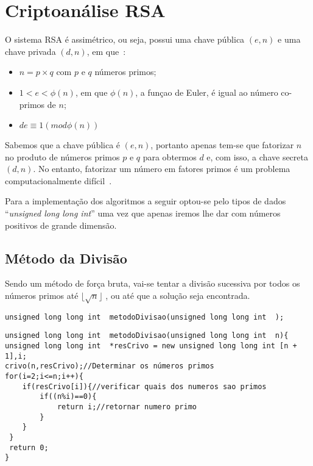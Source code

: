 
\chapter{Criptoanálise RSA}
\label{sec:CriptoanaliseRSA}

O sistema RSA é assimétrico, ou seja, possui uma chave pública $(e,n)$ e uma chave privada $(d,n)$, em que~\cite{Quaresma2009a}:

\begin{itemize}
    \item[]$n=p \times q$ com $p$ e $q$ números primos;
    \item[]$1<e< \phi(n)$, em que $\phi(n)$, a funçao de Euler, é igual ao número co-primos de $n$;
    \item[]$de\equiv 1(mod\phi(n))$
\end{itemize}

Sabemos que a chave pública é $(e,n)$, portanto apenas tem-se que fatorizar $n$ no produto de números primos $p$ e $q$ para obtermos $d$ e, com isso, a chave secreta $(d,n)$. No entanto, fatorizar um número em fatores primos é um problema computacionalmente difícil~\cite{Quaresma2009a}.

Para a implementação dos algoritmos a seguir optou-se pelo tipos de dados ``\emph{unsigned long long int}'' uma vez que apenas iremos lhe dar com números positivos de grande dimensão.


\section{Método da Divisão}
\label{sec:MetodoDivisao}

Sendo um método de força bruta, vai-se tentar a divisão sucessiva por todos os números primos até $\lfloor \sqrt{n} \rfloor$ , ou até que a solução seja encontrada.

\begin{lstlisting}[frame=single,mathescape=true,caption={Criptoanálise RSA ---Especificação de \texttt{MétodoDivisao}},captionpos=b,label={lst:metodoEuclides},basicstyle=\footnotesize]
unsigned long long int  metodoDivisao(unsigned long long int  );
\end{lstlisting}

\begin{lstlisting}[frame=single,mathescape=true,caption={Método de Divisão},captionpos=b,label={lst:MetodoDivisao},basicstyle=\footnotesize]
unsigned long long int  metodoDivisao(unsigned long long int  n){	
unsigned long long int  *resCrivo = new unsigned long long int [n + 1],i;
crivo(n,resCrivo);//Determinar os números primos
for(i=2;i<=n;i++){
    if(resCrivo[i]){//verificar quais dos numeros sao primos
        if((n%i)==0){
            return i;//retornar numero primo
        }
    }
 }
 return 0;
}
\end{lstlisting}

